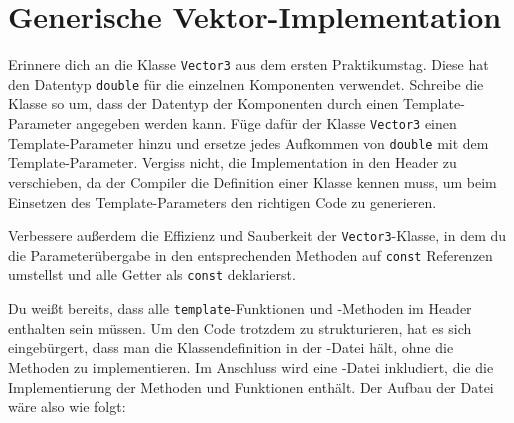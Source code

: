 \section{\ExercisePrefixAdvanced Generische Vektor-Implementation}
Erinnere dich an die Klasse \lstinline{Vector3} aus dem ersten Praktikumstag.
Diese hat den Datentyp \lstinline{double} für die einzelnen Komponenten verwendet.
Schreibe die Klasse so um, dass der Datentyp der Komponenten durch einen Template-Parameter angegeben werden kann.
Füge dafür der Klasse \lstinline{Vector3} einen Template-Parameter hinzu und ersetze jedes Aufkommen von \lstinline{double} mit dem Template-Parameter.
Vergiss nicht, die Implementation in den Header zu verschieben, da der Compiler die Definition einer Klasse kennen muss, um beim Einsetzen des Template-Parameters den richtigen Code zu generieren.

Verbessere außerdem die Effizienz und Sauberkeit der \lstinline{Vector3}-Klasse, in dem du die Parameterübergabe in den entsprechenden Methoden auf \lstinline{const} Referenzen umstellst und alle Getter als \lstinline{const} deklarierst.

Du weißt bereits, dass alle \lstinline{template}-Funktionen und -Methoden im Header enthalten sein müssen.
Um den Code trotzdem zu strukturieren, hat es sich eingebürgert, dass man die Klassendefinition in der -Datei hält, ohne die Methoden zu implementieren.
Im Anschluss wird eine -Datei inkludiert, die die Implementierung der Methoden und Funktionen enthält.
%
Der Aufbau der Datei  wäre also wie folgt:


